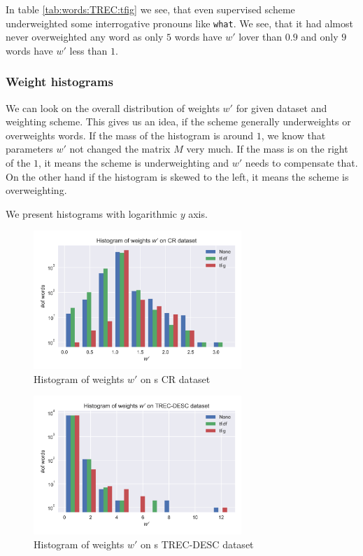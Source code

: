     In table \ref{tab:words:TREC:tfig} we see, that even supervised scheme  underweighted some interrogative pronouns like \texttt{what}.
    We see, that it had almost never overweighted any word as only $5$ words have $w'$ lover than $0.9$ and only $9$ words have $w'$ less than $1$.

    \subsubsection{Weight histograms}
    
    We can look on the overall distribution of weights $w'$ for given dataset and weighting scheme.
    This gives us an idea, if the scheme generally underweights or overweights words.
    If the mass of the histogram is around $1$, we know that parameters $w'$ not changed the matrix $M$ very much.
    If the mass is on the right of the $1$, it means the scheme is underweighting and $w'$ needs to compensate that. On the other hand if the histogram is skewed to the left, it means the scheme is overweighting.
    
    We present histograms with logarithmic $y$ axis.
    
    \begin{figure}
    \centerline{\includegraphics[width=0.7\textwidth]{images/histw_cr.png}}
    \caption[Histogram of weights $w'$ on s CR dataset]{Histogram of weights $w'$ on s CR dataset}
    \label{obr:hist:cr}
    \end{figure}

    \begin{figure}
    \centerline{\includegraphics[width=0.7\textwidth]{images/histw_desc.png}}
    \caption[Histogram of weights $w'$ on s TREC-DESC dataset]{Histogram of weights $w'$ on s TREC-DESC dataset}
    \label{obr:hist:desc}
    \end{figure}

